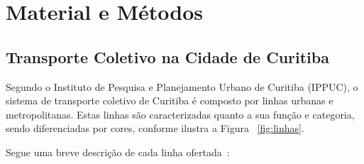 
\chapter{Material e Métodos}\label{cap:materialemetodos}

\section{Transporte Coletivo na Cidade de Curitiba}



Segundo o Instituto de Pesquisa e Planejamento Urbano de Curitiba (IPPUC), o sistema de transporte coletivo de Curitiba é composto por linhas urbanas e metropolitanas. Estas linhas são caracterizadas quanto a sua função e categoria, sendo diferenciadas por cores, conforme ilustra a Figura ~\ref{fig:linhas}. 

Segue uma breve descrição de cada linha ofertada~\cite{Cur:19}:

